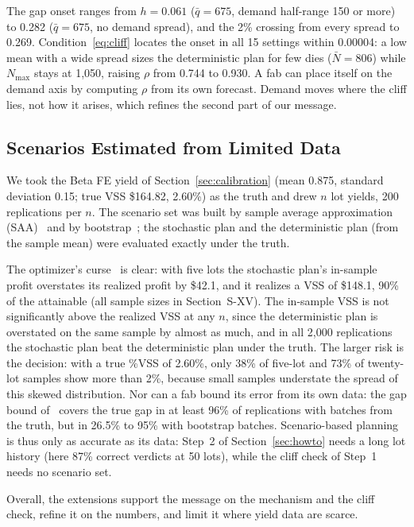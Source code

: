 The gap onset ranges from $h=0.061$ ($\bar q=675$, demand half-range 150 or more) to 0.282 ($\bar q=675$, no demand spread), and the 2\% crossing from every spread to 0.269. Condition~\eqref{eq:cliff} locates the onset in all 15 settings within 0.00004: a low mean with a wide spread sizes the deterministic plan for few dies ($\bar N=806$) while $N_{\max}$ stays at 1{,}050, raising $\rho$ from 0.744 to 0.930. A fab can place itself on the demand axis by computing $\rho$ from its own forecast. Demand moves where the cliff lies, not how it arises, which refines the second part of our message.

\subsection{Scenarios Estimated from Limited Data}
\label{sec:extA-data}

We took the Beta FE yield of Section~\ref{sec:calibration} (mean 0.875, standard deviation 0.15; true VSS \$164.82, 2.60\%) as the truth and drew $n$ lot yields, 200 replications per $n$. The scenario set was built by sample average approximation (SAA)~\cite{kleywegt2002} and by bootstrap~\cite{efron1993bootstrap}; the stochastic plan and the deterministic plan (from the sample mean) were evaluated exactly under the truth.

The optimizer's curse~\cite{smith2006curse} is clear: with five lots the stochastic plan's in-sample profit overstates its realized profit by \$42.1, and it realizes a VSS of \$148.1, 90\% of the attainable (all sample sizes in Section~\mbox{S-XV}). The in-sample VSS is not significantly above the realized VSS at any $n$, since the deterministic plan is overstated on the same sample by almost as much, and in all 2{,}000 replications the stochastic plan beat the deterministic plan under the truth. The larger risk is the decision: with a true \%VSS of 2.60\%, only 38\% of five-lot and 73\% of twenty-lot samples show more than 2\%, because small samples understate the spread of this skewed distribution. Nor can a fab bound its error from its own data: the gap bound of~\cite{mak1999monte,bayraksan2006assessing} covers the true gap in at least 96\% of replications with batches from the truth, but in 26.5\% to 95\% with bootstrap batches. Scenario-based planning is thus only as accurate as its data: Step~2 of Section~\ref{sec:howto} needs a long lot history (here 87\% correct verdicts at 50 lots), while the cliff check of Step~1 needs no scenario set.

Overall, the extensions support the message on the mechanism and the cliff check, refine it on the numbers, and limit it where yield data are scarce.
